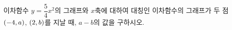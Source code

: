 \hspace*{2mm}\begin{minipage}[t]{\dimexpr\linewidth-2mm\relax}\vspace{0pt}
이차함수 $y=\dfrac{5}{4}x^2$의 그래프와 $x$축에 대하여 대칭인 이차함수의 그래프가 두 점 $(-4{,}\mkern3mu a)$, $(2{,}\mkern3mu b)$를 지날 때, $a-b$의 값을 구하시오.\end{minipage}
